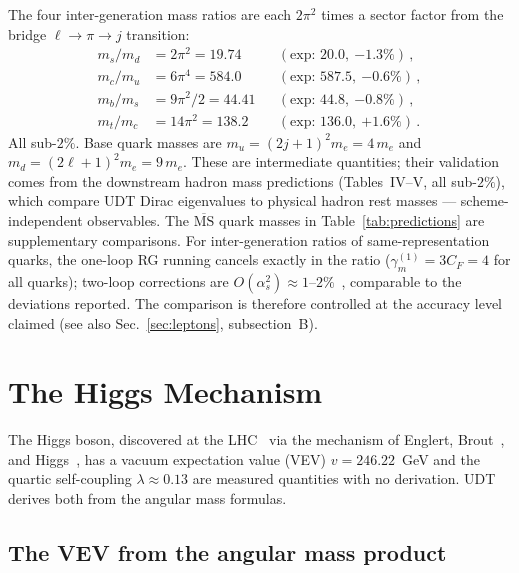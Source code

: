 \documentclass[aps,prd,twocolumn,superscriptaddress,nofootinbib,longbibliography]{revtex4-2}
\begin{document}
The four inter-generation mass ratios are each $2\pi^2$ times a
sector factor from the bridge $\ell \to \pi \to j$ transition:
\begin{align}
  m_s/m_d &= 2\pi^2 = 19.74
    &&(\text{exp: }20.0,\ {-1.3\%})\,,\\
  m_c/m_u &= 6\pi^4 = 584.0
    &&(\text{exp: }587.5,\ {-0.6\%})\,,\\
  m_b/m_s &= 9\pi^2/2 = 44.41
    &&(\text{exp: }44.8,\ {-0.8\%})\,,\\
  m_t/m_c &= 14\pi^2 = 138.2
    &&(\text{exp: }136.0,\ {+1.6\%})\,.
\end{align}
All sub-$2\%$.  Base quark masses are
$m_u = (2j+1)^2 m_e = 4\,m_e$ and
$m_d = (2\ell+1)^2 m_e = 9\,m_e$.  These are intermediate quantities;
their validation comes from the downstream hadron mass predictions
(Tables~IV--V, all sub-$2\%$), which compare UDT Dirac eigenvalues to
physical hadron rest masses --- scheme-independent observables.  The
$\overline{\mathrm{MS}}$ quark masses in Table~\ref{tab:predictions}
are supplementary comparisons.  For inter-generation ratios of
same-representation quarks, the one-loop RG running cancels exactly in
the ratio ($\gamma_m^{(1)} = 3C_F = 4$ for all quarks); two-loop
corrections are $O(\alpha_s^2) \approx 1$--$2\%$~\cite{PDG2024},
comparable to the deviations reported.  The comparison is therefore
controlled at the accuracy level claimed (see also
Sec.~\ref{sec:leptons}, subsection~B).

\section{The Higgs Mechanism}\label{sec:higgs}

The Higgs boson, discovered at the LHC~\cite{ATLAS2012,CMS2012} via the mechanism of Englert, Brout~\cite{Englert1964}, and Higgs~\cite{Higgs1964}, has a vacuum expectation value (VEV)
$v = 246.22$~GeV and the quartic self-coupling $\lambda \approx 0.13$
are measured quantities with no derivation.  UDT derives both from
the angular mass formulas.

\subsection{The VEV from the angular mass product}
\end{document}
